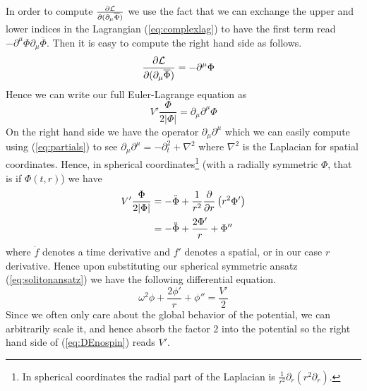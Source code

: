 In order to compute \(\pdv{\mathcal{L}}{(\partial_\mu\overline{\Phi})}\) we use the
fact that we can exchange the upper and lower indices in the Lagrangian
(\ref{eq:complexlag}) to have the first term read \(-\partial^\mu\Phi\partial_\mu\overline{\Phi}\).
Then it is easy to compute the right hand side as follows.
\begin{align}
    \pdv{\mathcal{L}}{(\partial_\mu\overline{\Phi})} & = -\partial^\mu\Phi
\end{align}
Hence we can write our full Euler-Lagrange equation as
\begin{equation}
    V'\frac{\Phi}{2|\Phi|} = \partial_\mu\partial^\mu\Phi
\end{equation}
On the right hand side we have the operator \(\partial_\mu\partial^\mu\) which
we can easily compute using (\ref{eq:partials}) to see \(\partial_\mu\partial^\mu = -\partial_t^2 + \nabla^2\)
where \(\nabla^2\) is the Laplacian for spatial coordinates. Hence, in spherical
coordinates\footnote{In spherical coordinates the radial part of the Laplacian
is \(\frac{1}{r^2}\partial_r\left(r^2\partial_r\right)\).} (with a radially
symmetric \(\Phi\), that is if \(\Phi(t,r)\)) we have
\begin{align}
    V'\frac{\Phi}{2|\Phi|} & = -\ddot{\Phi} + \frac{1}{r^2}\pdv{r}\left(r^2\Phi'\right) \\
                           & = -\ddot{\Phi} + \frac{2\Phi'}{r} + \Phi''
\end{align}
where \(\dot{f}\) denotes a time derivative and \(f'\) denotes a spatial, or in
our case \(r\) derivative. Hence upon substituting our spherical symmetric
ansatz (\ref{eq:solitonansatz}) we have the following differential equation.
\begin{equation}\label{eq:DEnospin}
    \omega^2\phi + \frac{2\phi'}{r} + \phi'' = \frac{V'}{2}
\end{equation}
Since we often only care about the global behavior of the potential, we can
arbitrarily scale it, and hence absorb the factor 2 into the potential so the
right hand side of (\ref{eq:DEnospin}) reads \(V'\).

